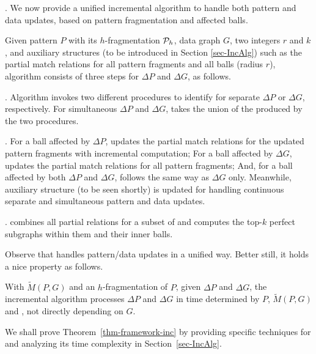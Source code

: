 . We now provide a unified incremental algorithm to handle both pattern and data updates,
based on pattern fragmentation and affected balls.


Given pattern $P$ with its $h$-fragmentation ${\cal P}_{h}$, data graph $G$, two integers $r$ and $k$,
and auxiliary structures (to be introduced in Section \ref{sec-IncAlg}) such as the partial match relations for all pattern fragments and all balls (radius $r$),
algorithm \inc  consists of three steps for $\Delta P$ and $\Delta G$, as follows.


.
Algorithm \inc invokes two different procedures to identify \affballsx for separate $\Delta P$ or $\Delta G$, respectively.
For  simultaneous $\Delta P$ and $\Delta G$, \inc takes the union of the \affballsx produced by  the two procedures.


.
For a ball affected by $\Delta P$, \inc updates the partial match relations for the updated pattern fragments with incremental computation;
For a ball affected by $\Delta G$, \inc updates the partial match relations for all pattern fragments;
And, for a ball affected by both $\Delta P$ and $\Delta G$, \inc follows the same way as $\Delta G$ only.
Meanwhile, auxiliary structure \fb (to be seen shortly) is updated for handling continuous separate and simultaneous pattern and data updates.


. \inc combines all partial relations for a subset of \affballsx and computes the top-$k$ perfect subgraphs within them and their inner balls.

\vspace{0.5ex}
Observe that \inc handles pattern/data updates in a unified way. Better still, it holds a nice property as follows.


\begin{theorem}
\label{thm-framework-inc}
With $\tilde{M}(P,G)$ and \fb \wrt an $h$-fragmentation of $P$, given $\Delta P$ and $\Delta G$,
the incremental algorithm \inc processes $\Delta P$ and $\Delta G$ in time
determined by $P$, $\tilde{M}(P,G)$ and \affballsx, not directly depending on $G$.
\end{theorem}

We shall prove Theorem~\ref{thm-framework-inc} by providing specific techniques for \inc and analyzing its time complexity in Section~\ref{sec-IncAlg}.



